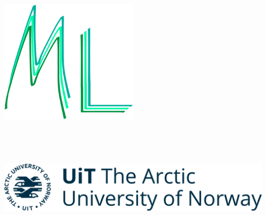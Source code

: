 \documentclass{beamer}
\begin{document}
\begin{frame}
\begin{textblock*}{841mm}
\begin{minipage}[tc]{0.15\textwidth}
        \end{minipage}
        \begin{minipage}[tc]{0.22\textwidth}
            \centering
            \includegraphics[width=\textwidth,height=60mm,keepaspectratio]{images/logo-ml.png}
        \end{minipage}
        \begin{minipage}[tc]{0.22\textwidth}
            \centering
            \includegraphics[width=\textwidth,height=60mm,keepaspectratio]{images/logo-uit.png}
        \end{minipage}
    \end{textblock*}
    
\end{frame}
\end{document}

